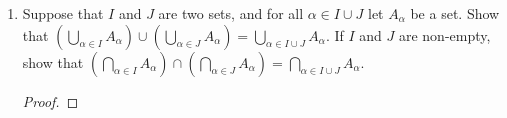\documentclass[../main.tex]{subfiles}
\begin{document}
\begin{enumerate}[ref={\thesection.\arabic*}]
\begin{proof}
\begin{equation*}
        \end{equation*}
        Therefore, by Exercise \ref{exr:A.1.5}, we have 
        \begin{equation*}
            y\in\{x\in A_\beta:x\in A_\alpha\text{ for all }\alpha\in I\} \Longleftrightarrow y\in\{x\in A_{\beta'}:x\in A_\alpha\text{ for all }\alpha\in I\}
        \end{equation*}
        as desired.\par
        As to the other question, by Definition \ref{dfn:setEquality}, $y\in\bigcap_{\alpha\in I}A_\alpha \Longrightarrow y\in\{x\in A_\beta:x\in A_\alpha\text{ for all }\alpha\in I\}$. Thus, by Axiom \ref{axm:specification}, $y\in A_\beta$ and $y\in A_\alpha$ for all $\alpha\in I$. But $A_\beta=A_\alpha$ for some $\alpha\in I$, so the condition that $y\in A_\beta$ is a tautology. Thus, $y\in A_\alpha$ for all $\alpha\in I$. A similar argument works in the other direction.
    \end{proof}
    \item \label{exr:3.4.10}Suppose that $I$ and $J$ are two sets, and for all $\alpha\in I\cup J$ let $A_\alpha$ be a set. Show that $(\bigcup_{\alpha\in I}A_\alpha)\cup(\bigcup_{\alpha\in J}A_\alpha)=\bigcup_{\alpha\in I\cup J}A_\alpha$. If $I$ and $J$ are non-empty, show that $(\bigcap_{\alpha\in I}A_\alpha)\cap(\bigcap_{\alpha\in J}A_\alpha)=\bigcap_{\alpha\in I\cup J}A_\alpha$.
    \begin{proof}

\end{proof}
\end{enumerate}
\end{document}
